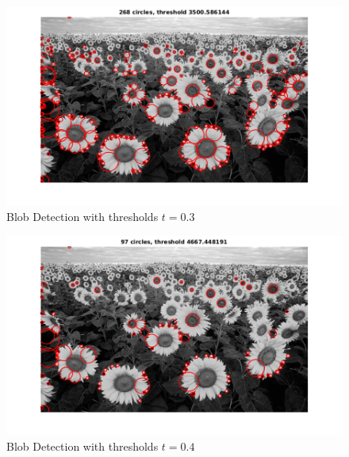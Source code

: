 \documentclass[letterpaper]{article}
\begin{document}
\begin{figure}[H]
\centering
\includegraphics[scale=0.6]{q2t03.png}
\caption{Blob Detection with thresholds $t = 0.3$}
\label{q23}
\end{figure}
\begin{figure}[H]
\centering
\includegraphics[scale=0.6]{q2t04.png}
\caption{Blob Detection with thresholds $t = 0.4$}
\label{q24}
\end{figure}
\end{document}
